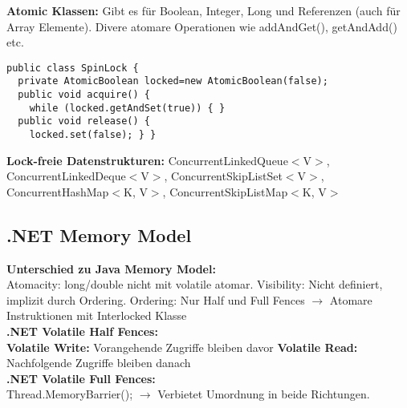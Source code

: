 \textcolor{b}{\textbf{Atomic Klassen:}} Gibt es für \textcolor{b}{Boolean, Integer, Long} und \textcolor{b}{Referenzen} (auch für Array Elemente). Divere atomare Operationen wie \textcolor{b}{addAndGet(), getAndAdd()} etc.
\begin{lstlisting}
public class SpinLock {
  private AtomicBoolean locked=new AtomicBoolean(false);
  public void acquire() {
    while (locked.getAndSet(true)) { }
  public void release() {
    locked.set(false); } }
\end{lstlisting}
\textcolor{b}{\textbf{Lock-freie Datenstrukturen:}}
ConcurrentLinkedQueue$<$V$>$, ConcurrentLinkedDeque$<$V$>$, ConcurrentSkipListSet$<$V$>$, ConcurrentHashMap$<$K, V$>$, ConcurrentSkipListMap$<$K, V$>$
\subsection{.NET Memory Model}
\textcolor{b}{\textbf{Unterschied zu Java Memory Model:}}\\
\textcolor{b}{Atomacity:} long/double nicht mit volatile atomar. \textcolor{b}{Visibility:} Nicht definiert, implizit durch Ordering. \textcolor{b}{Ordering:} Nur Half und Full Fences $\rightarrow$ Atomare Instruktionen mit \textcolor{b}{Interlocked} Klasse\\
\textcolor{b}{\textbf{.NET Volatile Half Fences:}}\\
\textbf{Volatile Write:} Vorangehende Zugriffe bleiben davor \textbf{Volatile Read:} Nachfolgende Zugriffe bleiben danach\\
\textcolor{b}{\textbf{.NET Volatile Full Fences:}}\\
Thread.MemoryBarrier(); $\rightarrow$ Verbietet Umordnung in beide Richtungen.